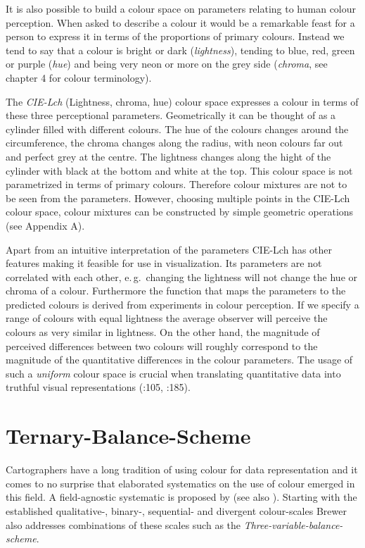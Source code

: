 \documentclass[a4paper]{scrartcl}
\begin{document}
It is also possible to build a colour space on parameters relating to human colour perception. When asked to describe a colour it would be a remarkable feast for a person to express it in terms of the proportions of primary colours. Instead we tend to say that a colour is bright or dark (\emph{lightness}), tending to blue, red, green or purple (\emph{hue}) and being very neon or more on the grey side (\emph{chroma}, see \cite{Fairchild2005} chapter 4 for colour terminology).

The \emph{CIE-Lch} (Lightness, chroma, hue) colour space expresses a colour in terms of these three perceptional parameters. Geometrically it can be thought of as a cylinder filled with different colours. The hue of the colours changes around the circumference, the chroma changes along the radius, with neon colours far out and perfect grey at the centre. The lightness changes along the hight of the cylinder with black at the bottom and white at the top. This colour space is not parametrized in terms of primary colours. Therefore colour mixtures are not to be seen from the parameters. However, choosing multiple points in the CIE-Lch colour space, colour mixtures can be constructed by simple geometric operations (see Appendix A).

Apart from an intuitive interpretation of the parameters CIE-Lch has other features making it feasible for use in visualization. Its parameters are not correlated with each other, e.\,g.~changing the lightness will not change the hue or chroma of a colour. Furthermore the function that maps the parameters to the predicted colours is derived from experiments in colour perception. If we specify a range of colours with equal lightness the average observer will perceive the colours as very similar in lightness. On the other hand, the magnitude of perceived differences between two colours will roughly correspond to the magnitude of the quantitative differences in the colour parameters. The usage of such a \emph{uniform} colour space is crucial when translating quantitative data into truthful visual representations (\cite{Ware2013}:105, \cite{Fairchild2005}:185).

\section*{Ternary-Balance-Scheme}

Cartographers have a long tradition of using colour for data representation and it comes to no surprise that elaborated systematics on the use of colour emerged in this field. A field-agnostic systematic is proposed by \textcite{Brewer1994a} (see also \cite{Brewer1994}). Starting with the established qualitative-, binary-, sequential- and divergent colour-scales Brewer also addresses combinations of these scales such as the \emph{Three-variable-balance-scheme}.
\end{document}

